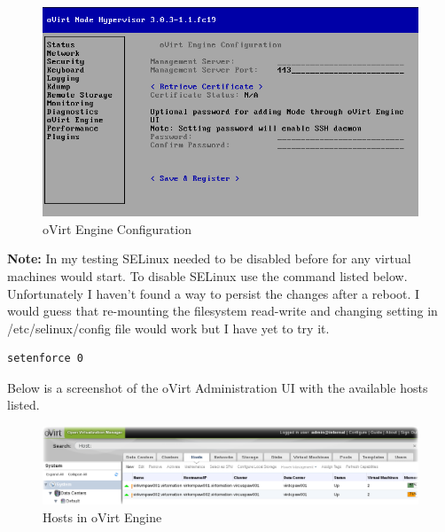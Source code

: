 \documentclass[11pt,letterpaper,oneside]{book}
\begin{document}
\begin{figure}[ht]
	\caption{oVirt Engine Configuration}
	\centering
	\label{fig:ovirt_10}
	\includegraphics[scale=0.40]{./pictures/ovirt_011.png}
\end{figure}

\textbf{Note:} In my testing SELinux needed to be disabled before for any virtual machines would start.  To disable SELinux use the command listed below.  Unfortunately I haven't found a way to persist the changes after a reboot.  I would guess that re-mounting the filesystem read-write and changing setting in /etc/selinux/config file would work but I have yet to try it.

\begin{minipage}{\linewidth}
\begin{lstlisting}[caption={Disable SELinux},label={lst:disable_selinux},language=bash]
setenforce 0
\end{lstlisting}
\end{minipage}

\noindent Below is a screenshot of the oVirt Administration UI with the available hosts listed.
\begin{figure}[ht]
	\caption{Hosts in oVirt Engine }
	\centering
	\label{fig:ovirt_engine_01}
	\includegraphics[scale=0.40]{./pictures/ovirt_engine_001.png}
\end{figure}
\end{document}
